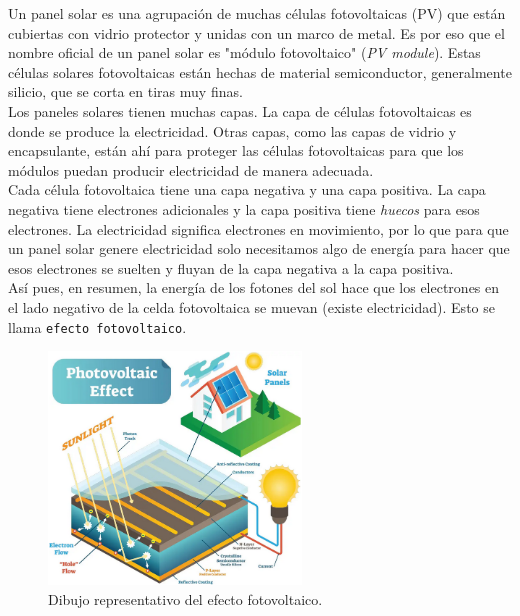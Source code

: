 \documentclass[12pt]{article}
\begin{document}
	\pagebreak
	
	\noindent Un panel solar es una agrupación de muchas células fotovoltaicas (PV) que están cubiertas con vidrio protector y unidas con un marco de metal. Es por eso que el nombre oficial de un panel solar es "módulo fotovoltaico" (\textit{PV module}). Estas células solares fotovoltaicas están hechas de material semiconductor, generalmente silicio, que se corta en tiras muy finas.\\
	
	\noindent Los paneles solares tienen muchas capas. La capa de células fotovoltaicas es donde se produce la electricidad. Otras capas, como las capas de vidrio y encapsulante, están ahí para proteger las células fotovoltaicas para que los módulos puedan producir electricidad de manera adecuada.\\
	
	\noindent Cada célula fotovoltaica tiene una capa negativa y una capa positiva. La capa negativa tiene electrones adicionales y la capa positiva tiene \textit{huecos} para esos electrones. La electricidad significa electrones en movimiento, por lo que para que un panel solar genere electricidad solo necesitamos algo de energía para hacer que esos electrones se suelten y fluyan de la capa negativa a la capa positiva. \\
	
	\noindent Así pues, en resumen, la energía de los fotones del sol hace que los electrones en el lado negativo de la celda fotovoltaica se muevan (existe electricidad). Esto se llama \texttt{efecto fotovoltaico}.\\
	
	\begin{figure}[h]
		\begin{center}
			\includegraphics[width=0.6\textwidth]{img/photovoltaic_effect.png}
			\caption{Dibujo representativo del efecto fotovoltaico.}
			\label{fig: efecto fotovoltaico}
		\end{center}
	\end{figure}
	
\end{document}
